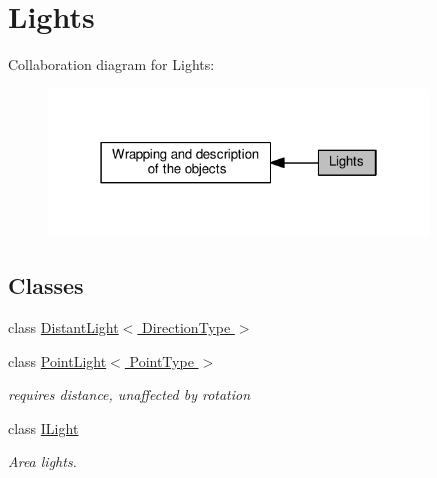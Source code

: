 \hypertarget{group__lights}{}\section{Lights}
\label{group__lights}
Collaboration diagram for Lights\+:\nopagebreak
\begin{figure}[H]
\begin{center}
\leavevmode
\includegraphics[width=286pt]{group__lights}
\end{center}
\end{figure}
\subsection*{Classes}
\begin{DoxyCompactItemize}
\item 
class \hyperlink{class_distant_light}{Distant\+Light$<$ Direction\+Type $>$}
\item 
class \hyperlink{class_point_light}{Point\+Light$<$ Point\+Type $>$}
\begin{DoxyCompactList}\small\item\em requires distance, unaffected by rotation \end{DoxyCompactList}\item 
class \hyperlink{class_i_light}{I\+Light}
\begin{DoxyCompactList}\small\item\em Area lights. \end{DoxyCompactList}\end{DoxyCompactItemize}
